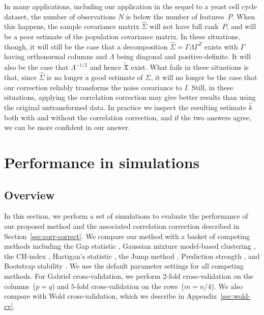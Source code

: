 \documentclass[12pt]{article}
\newcommand{\T}{T}
\newcommand{\dataX}{\mathfrak{X}}
\begin{document}
In many applications, including our application in the sequel to a yeast cell
cycle dataset, the number of observations $N$ is below the number of
features~$P$. When this happens, the sample covariance matrix $\hat \Sigma$
will not have full rank~$P$, and will be a poor estimate of the population
covariance matrix. In these situations, though, it will still be the case that
a decomposition $\hat \Sigma = \Gamma \Lambda \Gamma^\T$ exists with $\Gamma$
having orthonormal columns and $\Lambda$ being diagonal and positive-definite.
It will also be the case that $\Lambda^{-1/2}$ and hence $\tilde{\dataX}$
exist. What fails in these situations is that, since $\hat \Sigma$ is no longer
a good estimate of $\Sigma$, it will no longer be the case that our correction
reliably transforms the noise covariance to $I$. Still, in these situations,
applying the correlation correction may give better results than using the
original untransformed data. In practice we inspect the resulting estimate
$\hat k$ both with and without the correlation correction, and if the two
answers agree, we can be more confident in our answer.


\section{Performance in simulations}
\label{sec:simulations}

\subsection{Overview}

In this section, we perform a set of simulations to evaluate the performance
of our proposed method and the associated correlation correction described in
Section~\ref{sec:corr-correct}.  We compare our method with a basket of
competing methods including the Gap statistic
\citep{tibshirani2001estimating}, Gaussian mixture model-based clustering
\citep{fraley2002model}, the CH-index \citep{calinski1974dendrite}, Hartigan's
statistic \citep{hartigan1975clustering}, the Jump method
\citep{sugar2003finding}, Prediction strength \citep{tibshirani2005cluster},
and Bootstrap stability \citep{fang2012selection}.  We use the default
parameter settings for all competing methods.  For Gabriel cross-validation,
we perform $2$-fold cross-validation on the columns~($p=q$) and $5$-fold
cross-validation on the rows~($m=n/4$).  We also compare with Wold
cross-validation, which we describe in Appendix~\ref{sec:wold-cv}.
\end{document}
